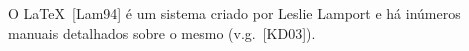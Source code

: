 O {\LaTeX}~[Lam94] é um sistema criado por Leslie
Lamport e há inúmeros manuais detalhados sobre o mesmo
(v.g.~[KD03]).
